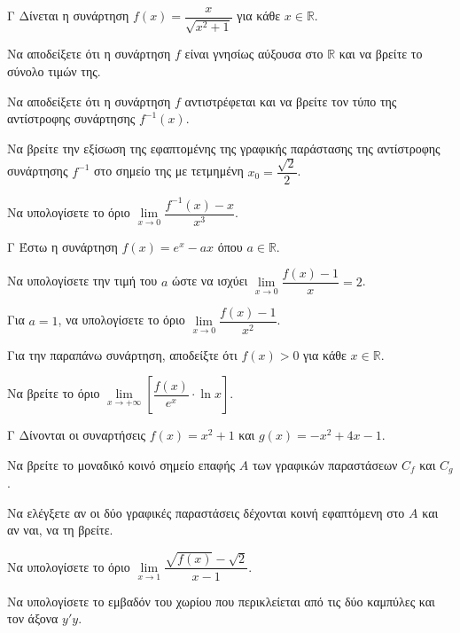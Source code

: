 \begin{thema}{Γ}
Δίνεται η συνάρτηση $f(x) = \dfrac{x}{\sqrt{x^2+1}}$ για κάθε $x \in \mathbb{R}$.
\begin{erwthma}
  \item Να αποδείξετε ότι η συνάρτηση $f$ είναι γνησίως αύξουσα στο $\mathbb{R}$ και να βρείτε το σύνολο τιμών της.
  \item Να αποδείξετε ότι η συνάρτηση $f$ αντιστρέφεται και να βρείτε τον τύπο της αντίστροφης συνάρτησης $f^{-1}(x)$.
  \item Να βρείτε την εξίσωση της εφαπτομένης της γραφικής παράστασης της αντίστροφης συνάρτησης $f^{-1}$ στο σημείο της με τετμημένη $x_0 = \dfrac{\sqrt{2}}{2}$.
  \item Να υπολογίσετε το όριο $\lim\limits_{x \to 0} \dfrac{f^{-1}(x) - x}{x^3}$.
\end{erwthma}
\end{thema}

\begin{thema}{Γ}
Έστω η συνάρτηση $f(x) = e^x - a x$ όπου $a \in \mathbb{R}$.
\begin{erwthma}
  \item Να υπολογίσετε την τιμή του $a$ ώστε να ισχύει $\lim\limits_{x \to 0} \dfrac{f(x) - 1}{x} = 2$.
  \item Για $a = 1$, να υπολογίσετε το όριο $\lim\limits_{x \to 0} \dfrac{f(x) - 1}{x^2}$.
  \item Για την παραπάνω συνάρτηση, αποδείξτε ότι $f(x) > 0$ για κάθε $x\in\mathbb{R}$.
  \item Να βρείτε το όριο $\lim\limits_{x \to +\infty} \left[ \dfrac{f(x)}{e^x} \cdot \ln x \right]$.
\end{erwthma}
\end{thema}

\begin{thema}{Γ}
Δίνονται οι συναρτήσεις $f(x) = x^2 + 1$ και $g(x) = -x^2 + 4x - 1$.
\begin{erwthma}
  \item Να βρείτε το μοναδικό κοινό σημείο επαφής $A$ των γραφικών παραστάσεων $C_f$ και $C_g$.
  \item Να ελέγξετε αν οι δύο γραφικές παραστάσεις δέχονται κοινή εφαπτόμενη στο $A$ και αν ναι, να τη βρείτε.
  \item Να υπολογίσετε το όριο $\lim\limits_{x \to 1} \dfrac{\sqrt{f(x)} - \sqrt{2}}{x - 1}$.
  \item Να υπολογίσετε το εμβαδόν του χωρίου που περικλείεται από τις δύο καμπύλες και τον άξονα $y'y$.
\end{erwthma}
\end{thema}

